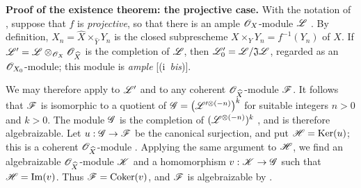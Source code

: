 \begin{env}[5.2.5]
\label{III.5.2.5}
\textbf{Proof of the existence theorem: the projective case.}
With the notation of , suppose that $f$ is
\emph{projective}, so that there is an ample $\mathscr{O}_X$-module $\mathscr{L}$
.  By definition, $X_n=\widehat{X}\times_{\widehat{Y}}Y_n$
is the closed subprescheme
$X\times_Y Y_n=f^{-1}(Y_n)$ of $X$.  If $\mathscr{L}'=\mathscr{L}\otimes_{\mathscr{O}_X}\mathscr{O}_{\widehat{X}}$
is the completion of $\mathscr{L}$, then
$\mathscr{L}'_0=\mathscr{L}/\mathfrak{J}\mathscr{L}$, regarded as an
$\mathscr{O}_{X_0}$-module; this module is \emph{ample}
[(i~\emph{bis})].

We may therefore apply  to $\mathscr{L}'$ and to any
coherent $\mathscr{O}_{\widehat{X}}$-module $\mathscr{F}$.  It follows that
$\mathscr{F}$ is isomorphic to a quotient of $\mathscr{G}=
\bigl(\mathscr{L}'^{\otimes(-n)}\bigr)^k$
for suitable integers $n>0$ and $k>0$.  The module $\mathscr{G}$ is the
completion of $(\mathscr{L}^{\otimes(-n)})^k$
, and is therefore algebraizable.  Let
$u:\mathscr{G}\to\mathscr{F}$ be the canonical surjection, and put
$\mathscr{H}=\operatorname{Ker}(u)$; this is a coherent
$\mathscr{O}_{\widehat{X}}$-module .  Applying the same
argument to $\mathscr{H}$, we find an algebraizable
$\mathscr{O}_{\widehat{X}}$-module $\mathscr{K}$ and a homomorphism
$v:\mathscr{K}\to\mathscr{G}$ such that $\mathscr{H}=\operatorname{Im}(v)$.  Thus
$\mathscr{F}=\operatorname{Coker}(v)$, and $\mathscr{F}$ is algebraizable by
.
\end{env}

